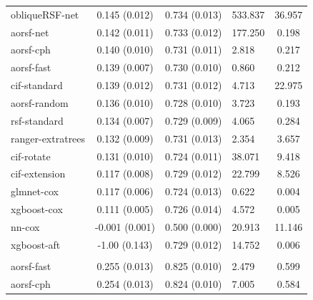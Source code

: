 \documentclass[twoside,11pt]{article}\usepackage[]{graphicx}\usepackage[]{xcolor}
\newenvironment{knitrout}{}{} %
\begin{document}
\begin{knitrout}
\begin{longtable}[t]{lcclc}
\hline
\hspace{1em}obliqueRSF-net & 0.145 (0.012) & 0.734 (0.013) & 533.837 & 36.957\\
\hspace{1em}aorsf-net & 0.142 (0.011) & 0.733 (0.012) & 177.250 & 0.198\\
\hspace{1em}aorsf-cph & 0.140 (0.010) & 0.731 (0.011) & 2.818 & 0.217\\
\hspace{1em}aorsf-fast & 0.139 (0.007) & 0.730 (0.010) & 0.860 & 0.212\\
\hspace{1em}cif-standard & 0.139 (0.012) & 0.731 (0.012) & 4.713 & 22.975\\
\hspace{1em}aorsf-random & 0.136 (0.010) & 0.728 (0.010) & 3.723 & 0.193\\
\hspace{1em}rsf-standard & 0.134 (0.007) & 0.729 (0.009) & 4.065 & 0.284\\
\hspace{1em}ranger-extratrees & 0.132 (0.009) & 0.731 (0.013) & 2.354 & 3.657\\
\hspace{1em}cif-rotate & 0.131 (0.010) & 0.724 (0.011) & 38.071 & 9.418\\
\hspace{1em}cif-extension & 0.117 (0.008) & 0.729 (0.012) & 22.799 & 8.526\\
\hspace{1em}glmnet-cox & 0.117 (0.006) & 0.724 (0.013) & 0.622 & 0.004\\
\hspace{1em}xgboost-cox & 0.111 (0.005) & 0.726 (0.014) & 4.572 & 0.005\\
\hspace{1em}nn-cox & -0.001 (0.001) & 0.500 (0.000) & 20.913 & 11.146\\
\hspace{1em}xgboost-aft & -1.00 (0.143) & 0.729 (0.012) & 14.752 & 0.006\\
\addlinespace[0.3em]
\hline
\multicolumn{5}{l}{\textit{\textbf{Serum free light chain; death, n = 7874, p = 10}}}\\
\hline
\hspace{1em}aorsf-fast & 0.255 (0.013) & 0.825 (0.010) & 2.479 & 0.599\\
\hspace{1em}aorsf-cph & 0.254 (0.013) & 0.824 (0.010) & 7.005 & 0.584\\

\end{longtable}
\end{knitrout}
\end{document}
